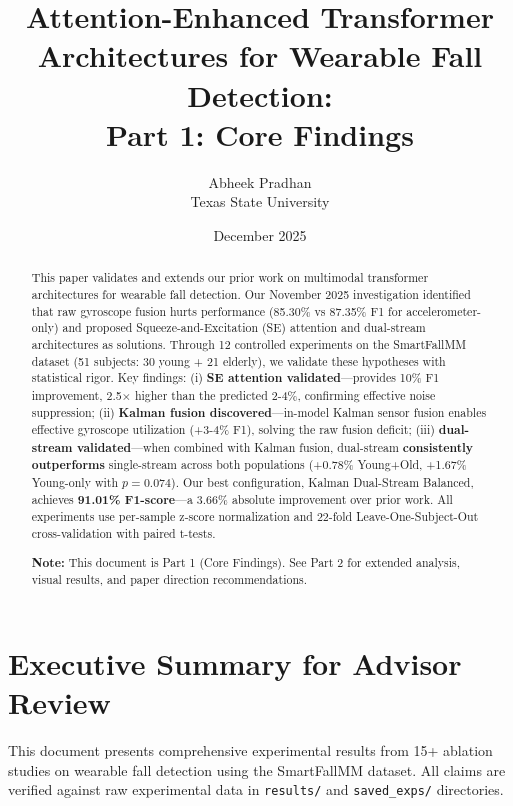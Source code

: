 \documentclass{article}
\title{Attention-Enhanced Transformer Architectures for Wearable Fall Detection:\\Part 1: Core Findings}
\author{Abheek Pradhan\\Texas State University}
\date{December 2025}
\begin{document}
\maketitle

\begin{abstract}
This paper validates and extends our prior work on multimodal transformer architectures for wearable fall detection. Our November 2025 investigation identified that raw gyroscope fusion hurts performance (85.30\% vs 87.35\% F1 for accelerometer-only) and proposed Squeeze-and-Excitation (SE) attention and dual-stream architectures as solutions. Through 12 controlled experiments on the SmartFallMM dataset (51 subjects: 30 young + 21 elderly), we validate these hypotheses with statistical rigor. Key findings: (i) \textbf{SE attention validated}---provides 10\% F1 improvement, 2.5$\times$ higher than the predicted 2-4\%, confirming effective noise suppression; (ii) \textbf{Kalman fusion discovered}---in-model Kalman sensor fusion enables effective gyroscope utilization (+3-4\% F1), solving the raw fusion deficit; (iii) \textbf{dual-stream validated}---when combined with Kalman fusion, dual-stream \textbf{consistently outperforms} single-stream across both populations (+0.78\% Young+Old, +1.67\% Young-only with $p=0.074$). Our best configuration, Kalman Dual-Stream Balanced, achieves \textbf{91.01\% F1-score}---a 3.66\% absolute improvement over prior work. All experiments use per-sample z-score normalization and 22-fold Leave-One-Subject-Out cross-validation with paired t-tests.

\textbf{Note:} This document is Part 1 (Core Findings). See Part 2 for extended analysis, visual results, and paper direction recommendations.
\end{abstract}

\section*{Executive Summary for Advisor Review}

This document presents comprehensive experimental results from 15+ ablation studies on wearable fall detection using the SmartFallMM dataset. All claims are verified against raw experimental data in \texttt{results/} and \texttt{saved\_exps/} directories.
\end{document}
